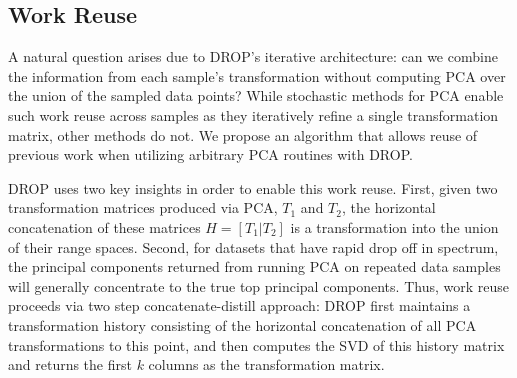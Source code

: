 \subsection{Work Reuse}
\label{subsec:reuse}

A natural question arises due to DROP's iterative architecture: can we combine the information from each sample's transformation without computing PCA over the union of the sampled data points? 
While stochastic methods for PCA enable such work reuse across samples as they iteratively refine a single transformation matrix, other methods do not.
We propose an algorithm that allows reuse of previous work when utilizing arbitrary PCA routines with DROP.

DROP uses two key insights in order to enable this work reuse.  
First, given two transformation matrices produced via PCA, $T_1$ and $T_2$, the horizontal concatenation of these matrices $H = [T_1 | T_2]$ is a transformation into the union of their range spaces.
Second, for datasets that have rapid drop off in spectrum, the principal components returned from running PCA on repeated data samples will generally concentrate to the true top principal components. 
Thus, work reuse proceeds via two step concatenate-distill approach:
DROP first maintains a transformation history consisting of the horizontal concatenation of all PCA transformations to this point, and then computes the SVD of this history matrix and returns the first $k$ columns as the transformation matrix. 


